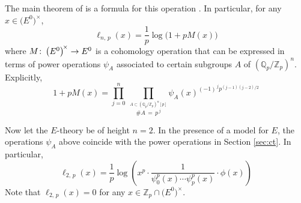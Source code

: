 \documentclass{gtpart}
\theoremstyle{definition}
\theoremstyle{remark}
\def\co{\colon\thinspace}
\newcommand{\mb}[1]{\mathbb{#1}}
\newcommand{\BQ}{{\mb Q}}
\newcommand{\BZ}{{\mb Z}}
\renewcommand{\=}{\approx}
\renewcommand{\-}{\sim}
\numberwithin{equation}{section}
\numberwithin{thm}{section}
\begin{document}
The main theorem of \cite{log} is a formula for this operation 
\cite[Theorem 1.11]{log}.  In particular, for any 
$x \in \big( E^0 \big)^{\!\times}$, 
\begin{equation}
 \label{M}
 \ell_{n,\,p}(x) = \frac{1}{p} \log\big(1 + p M(x)\big) 
\end{equation}
where $M \co \big( E^0 \big)^{\!\times} \to E^0$ is a cohomology operation that 
can be expressed in terms of power operations $\psi_A$ associated to certain 
subgroups $A$ of $(\BQ_p/\BZ_p)^n$.  Explicitly, 
\[
 1 + p M(x) = \prod_{j=0}^n ~ \prod_{\stackrel{\scriptstyle A \subset 
 (\BQ_p/\BZ_p)^n [p]}{\#A \, = \, p^{\,j}}} 
 \psi_A(x)^{(-1)^{\,j} p^{(j-1)(j-2)/2}} 
\]

Now let the $E$-theory be of height $n = 2$.  In the presence of a model for 
$E$, the operations $\psi_A$ above coincide with the power operations in Section 
\ref{sec:ct}.  In particular, 
\begin{equation}
 \label{l2p}
 \ell_{2,\,p}(x) = \frac{1}{p} \log \left( x^p \cdot 
 \frac{1}{\psi^p_0(x) \cdots \psi^p_p(x)} \cdot \phi(x) \right) 
\end{equation}
Note that $\ell_{2,\,p}(x) = 0$ for any 
$x \in \BZ_p \cap \big( E^0 \big)^{\!\times}$.  
\end{document}
